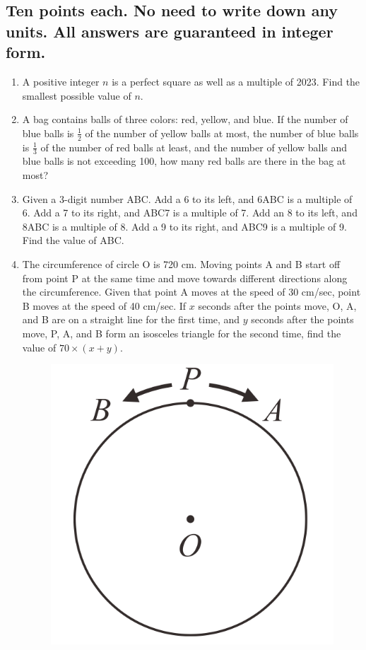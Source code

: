 \documentclass[12pt]{scrartcl}
\begin{document}
\subsection*{Ten points each. \textbf{No need to write down any units.} All answers are guaranteed in integer form.}
\hrulefill %
\begin{enumerate}[resume]
    \item A positive integer $n$ is a perfect square as well as a multiple of 2023. Find the smallest possible value of $n$.

    \hrulefill \item A bag contains balls of three colors: red, yellow, and blue. If the number of blue balls is $\frac{1}{2}$ of the number of yellow balls at most, the number of blue balls is $\frac{1}{3}$ of the number of red balls at least, and the number of yellow balls and blue balls is not exceeding 100, how many red balls are there in the bag at most?

    \hrulefill \item Given a 3-digit number ABC. Add a 6 to its left, and 6ABC is a multiple of 6. Add a 7 to its right, and ABC7 is a multiple of 7. Add an 8 to its left, and 8ABC is a multiple of 8. Add a 9 to its right, and ABC9 is a multiple of 9. Find the value of ABC.

    \hrulefill \item The circumference of circle O is 720 cm. Moving points A and B start off from point P at the same time and move towards different directions along the circumference. Given that point A moves at the speed of 30 cm/sec, point B moves at the speed of 40 cm/sec. If $x$ seconds after the points move, O, A, and B are on a straight line for the first time, and $y$ seconds after the points move, P, A, and B form an isosceles triangle for the second time, find the value of $70 \times (x + y)$.
    \begin{figure}[h]
        \centering
        \includegraphics[scale=0.4]{StarGen/0Figure/wmi2023G6B-num4.png}
    \end{figure}


\end{enumerate}
\end{document}
